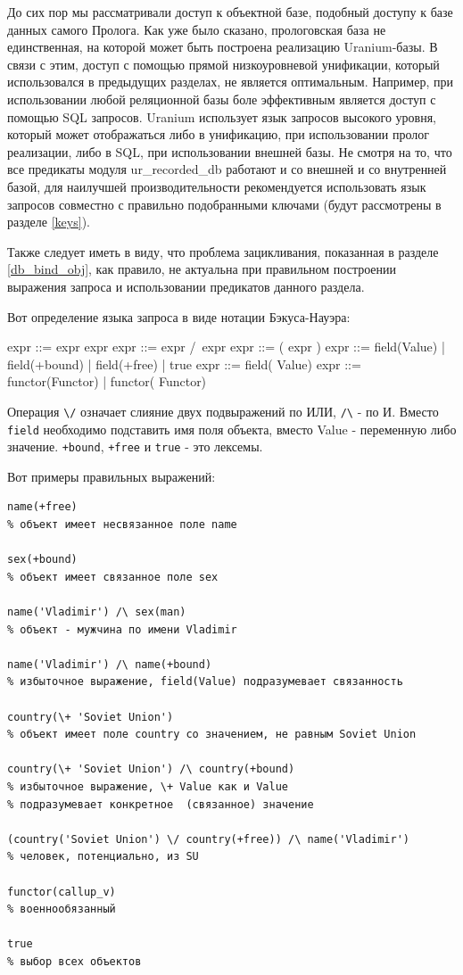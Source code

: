 \documentclass[a4paper]{book}
\def\ur{Uranium}
\begin{document}
До сих пор мы рассматривали доступ к объектной базе, подобный
доступу к базе данных самого Пролога. Как уже было сказано,
прологовская база не единственная, на которой может быть
построена реализацию \ur-базы. В связи с этим, доступ с помощью
прямой низкоуровневой унификации, который использовался в
предыдущих разделах, не является оптимальным. Например, при
использовании любой реляционной базы боле эффективным является
доступ с помощью SQL запросов. \ur{} использует язык запросов
высокого уровня, который может отображаться либо в унификацию,
при использовании пролог реализации, либо в SQL, при
использовании внешней базы. Не смотря на то, что все предикаты
модуля ur_recorded_db работают и со внешней и со внутренней
базой, для наилучшей производительности рекомендуется
использовать язык запросов совместно с правильно подобранными
ключами (будут рассмотрены в разделе \ref{keys}).

Также следует иметь в виду, что проблема зацикливания, показанная
в разделе \ref{db_bind_obj}, как правило, не актуальна при
правильном построении выражения запроса и использовании
предикатов данного раздела.

Вот определение языка запроса в виде нотации Бэкуса-Науэра:

\begin{genexample}{}{}
expr ::= expr \/ expr
expr ::= expr /\ expr
expr ::= ( expr )
expr ::= field(Value) | field(+bound) | field(+free) | true
expr ::= field(\+ Value)
expr ::= functor(Functor) | functor(\+ Functor)
\end{genexample}
 
Операция \verb|\/| означает слияние двух подвыражений по ИЛИ,
\verb|/\| - по И. Вместо \verb|field| необходимо подставить имя
поля объекта, вместо Value - переменную либо
значение. \verb|+bound|, \verb|+free| и \verb|true| - это
лексемы.

Вот примеры правильных выражений:

\begin{verbatim}
name(+free)   
% объект имеет несвязанное поле name

sex(+bound)   
% объект имеет связанное поле sex

name('Vladimir') /\ sex(man) 
% объект - мужчина по имени Vladimir

name('Vladimir') /\ name(+bound) 
% избыточное выражение, field(Value) подразумевает связанность

country(\+ 'Soviet Union') 
% объект имеет поле country со значением, не равным Soviet Union

country(\+ 'Soviet Union') /\ country(+bound) 
% избыточное выражение, \+ Value как и Value 
% подразумевает конкретное  (связанное) значение

(country('Soviet Union') \/ country(+free)) /\ name('Vladimir') 
% человек, потенциально, из SU

functor(callup_v)
% военнообязанный

true
% выбор всех объектов
\end{verbatim}
\end{document}
